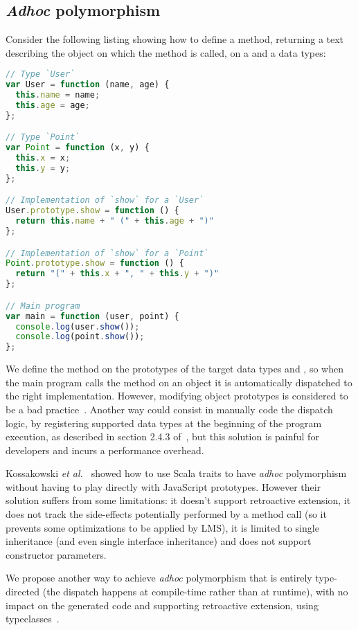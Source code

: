 \documentclass[american,english,runningheads]{llncs}
\newcommand{\etal}{\emph{et al.~}}
\begin{document}
\subsection{\emph{Adhoc} polymorphism}

Consider the following listing showing how to define a  method, returning a text describing the object on which the method is called, on a  and a  data types:

\begin{lstlisting}[language=JavaScript]
// Type `User`
var User = function (name, age) {
  this.name = name;
  this.age = age;
};

// Type `Point`
var Point = function (x, y) {
  this.x = x;
  this.y = y;
};

// Implementation of `show` for a `User`
User.prototype.show = function () {
  return this.name + " (" + this.age + ")"
};

// Implementation of `show` for a `Point`
Point.prototype.show = function () {
  return "(" + this.x + ", " + this.y + ")"
};

// Main program
var main = function (user, point) {
  console.log(user.show());
  console.log(point.show());
};
\end{lstlisting}

We define the  method on the prototypes of the target data types  and , so when the main program calls the  method on an object it is automatically dispatched to the right implementation. However, modifying object prototypes is considered to be a bad practice~\cite{Zakas12_MaintainableJs}. Another way could consist in manually code the dispatch logic, by registering supported data types at the beginning of the program execution, as described in section 2.4.3 of~\cite{Abelson83_SICP}, but this solution is painful for developers and incurs a performance overhead.

Kossakowski \etal{} showed how to use Scala traits to have \emph{adhoc} polymorphism without having to play directly with JavaScript prototypes. However their solution suffers from some limitations: it doesn’t support retroactive extension, it does not track the side-effects potentially performed by a method call (so it prevents some optimizations to be applied by LMS), it is limited to single inheritance (and even single interface inheritance) and does not support constructor parameters.

We propose another way to achieve \emph{adhoc} polymorphism that is entirely type-directed (the dispatch happens at compile-time rather than at runtime), with no impact on the generated code and supporting retroactive extension, using typeclasses~\cite{Wadler89_AdhocPolymorphism,Odersky06_Typeclasses,Oliveira10_Typeclasses}.
\end{document}
